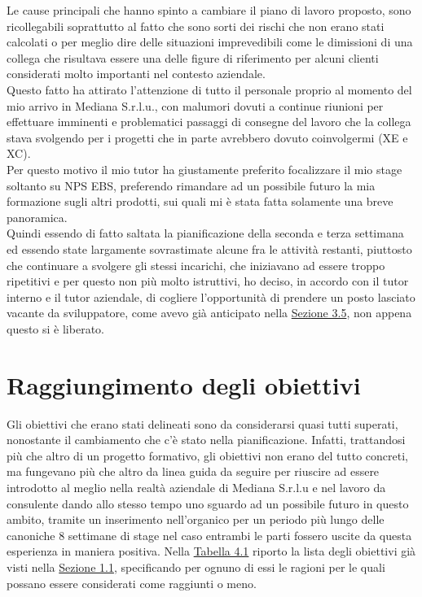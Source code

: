 \newpage
Le cause principali che hanno spinto a cambiare il piano di lavoro proposto, sono ricollegabili soprattutto al fatto che sono sorti dei rischi che non erano stati calcolati o per meglio dire delle situazioni imprevedibili come le dimissioni di una collega che risultava essere una delle figure di riferimento per alcuni clienti considerati molto importanti nel contesto aziendale. \\
Questo fatto ha attirato l'attenzione di tutto il personale proprio al momento del mio arrivo in Mediana S.r.l.u., con malumori dovuti a continue riunioni per effettuare imminenti e problematici passaggi di consegne del lavoro che la collega stava svolgendo per i progetti che in parte avrebbero dovuto coinvolgermi (XE e XC). \\
Per questo motivo il mio tutor ha giustamente preferito focalizzare il mio stage soltanto su NPS EBS, preferendo rimandare ad un possibile futuro la mia formazione sugli altri prodotti, sui quali mi è stata fatta solamente una breve panoramica. \\
Quindi essendo di fatto saltata la pianificazione della seconda e terza settimana ed essendo state largamente sovrastimate alcune fra le attività restanti, piuttosto che continuare a svolgere gli stessi incarichi, che iniziavano ad essere troppo ripetitivi e per questo non più molto istruttivi, ho deciso, in accordo con il tutor interno e il tutor aziendale, di cogliere l'opportunità di prendere un posto lasciato vacante da sviluppatore, come avevo già anticipato nella \hyperref[seconda fase]{Sezione 3.5}, non appena questo si è liberato. 

\section{Raggiungimento degli obiettivi}
Gli obiettivi che erano stati delineati sono da considerarsi quasi tutti superati, nonostante il cambiamento che c'è stato nella pianificazione. Infatti, trattandosi più che altro di un progetto formativo, gli obiettivi non erano del tutto concreti, ma fungevano più che altro da linea guida da seguire per riuscire ad essere introdotto al meglio nella realtà aziendale di Mediana S.r.l.u e nel lavoro da consulente dando allo stesso tempo uno sguardo ad un possibile futuro in questo ambito, tramite un inserimento nell'organico per un periodo più lungo delle canoniche 8 settimane di stage nel caso entrambi le parti fossero uscite da questa esperienza in maniera positiva.
Nella \hyperref[tabella obiettivi]{Tabella 4.1} riporto la lista degli obiettivi già visti nella \hyperref[obiettivi]{Sezione 1.1}, specificando per ognuno di essi le ragioni per le quali possano essere considerati come raggiunti o meno.

